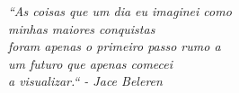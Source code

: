\begin{epigrafe}
    \vspace*{\fill}
	\begin{flushright}
		\textit{``As coisas que um dia eu imaginei como\\ minhas maiores conquistas\\
			 foram apenas o primeiro passo rumo a\\ um futuro que apenas comecei\\
			 a visualizar.`` - Jace Beleren}
	\end{flushright}
\end{epigrafe}
